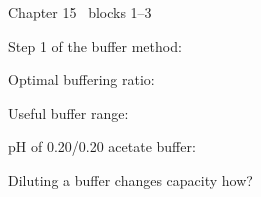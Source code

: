 \documentclass{apchem-worksheet}
\begin{document}
\begin{spiralstrip}{Chapter 15 \textbullet\ blocks 1--3}
  \item Step 1 of the buffer method:
  \item Optimal buffering ratio: 
  \item Useful buffer range: 
  \item pH of \SI{0.20}{\Molar}/\SI{0.20}{\Molar} acetate buffer:
  \item Diluting a buffer changes capacity how?
\end{spiralstrip}
\end{document}
